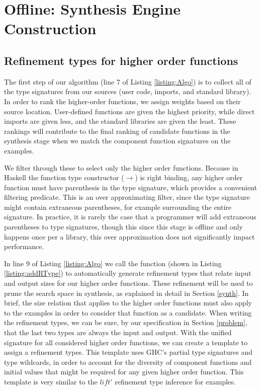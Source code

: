 \section{Offline: Synthesis Engine Construction} \label{offline}



\subsection{Refinement types for higher order functions}\label{HORtypeInf}

The first step of our algorithm (line 7 of Listing \ref{listing:Algo}) is to collect all of the type signatures from our sources (user code, imports, and standard library).
In order to rank the higher-order functions, we assign weights based on their source location. User-defined functions are given the highest priority, while direct imports are given less, and the standard libraries are given the least. 
These rankings will contribute to the final ranking of candidate functions in the synthesis stage when we match the component function signatures on the examples.

We filter through these to select only the higher order functions. 
Because in Haskell the function type constructor ($\to$) is right binding, any higher order function must have parenthesis in the type signature, which provides a convenient filtering predicate. 
This is an over approximating filter, since the type signature might contain extraneous parentheses, for example surrounding the entire signature. 
In practice, it is rarely the case that a programmer will add extraneous parentheses to type signatures, though this since this stage is offline and only happens once per a library, this over approximation does not significantly impact performance.

In line 9 of Listing \ref{listing:Algo} we call the  function (shown in Listing \ref{listing:addRType}) to automatically generate refinement types that relate input and output sizes for our higher order functions.
These refinement will be used to prune the search space in synthesis, as explained in detail in Section \ref{synth}.
In brief, the size relation that applies to the higher order functions must also apply to the examples in order to consider that function as a candidate.
When writing the refinement types, we can be sure, by our specification in Section \ref{problem}, that the last two types are always the input and output.
With the unified signature for all considered higher order functions, we can create a template to assign a refinement types.
This template uses GHC's partial type signatures and type wildcards, in order to account for the diversity of component functions and initial values that might be required for any given higher order function.
This template is very similar to the $lift'$ refinement type inference for examples.

